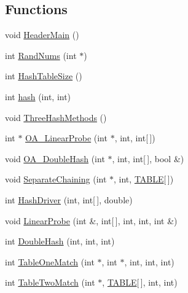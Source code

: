 \subsection*{Functions}
\begin{DoxyCompactItemize}
\item 
void \hyperlink{_bradshaw-_mansfield-_assn2-_h_a_s_h_prog_8cpp_ad0ff1b56e8aa2267183dc975be2704c3}{HeaderMain} ()
\item 
int \hyperlink{_bradshaw-_mansfield-_assn2-_h_a_s_h_prog_8cpp_ad02a3d3bea24e6a374d52753e741ae54}{RandNums} (int $\ast$)
\item 
int \hyperlink{_bradshaw-_mansfield-_assn2-_h_a_s_h_prog_8cpp_a0ab6301502b50757d27084788bab0db3}{HashTableSize} ()
\item 
int \hyperlink{_bradshaw-_mansfield-_assn2-_h_a_s_h_prog_8cpp_a3cbbd19bf1195623cc2c00ce8b55eaeb}{hash} (int, int)
\item 
void \hyperlink{_bradshaw-_mansfield-_assn2-_h_a_s_h_prog_8cpp_ac4885dc21b261220f2a030b1ad06aec5}{ThreeHashMethods} ()
\item 
int $\ast$ \hyperlink{_bradshaw-_mansfield-_assn2-_h_a_s_h_prog_8cpp_aa4c8e3922c8cd75082eae40ba8cd0205}{OA\_\-LinearProbe} (int $\ast$, int, int\mbox{[}$\,$\mbox{]})
\item 
void \hyperlink{_bradshaw-_mansfield-_assn2-_h_a_s_h_prog_8cpp_aa08a3d5e09643b1011e506d60a89a7f2}{OA\_\-DoubleHash} (int $\ast$, int, int\mbox{[}$\,$\mbox{]}, bool \&)
\item 
void \hyperlink{_bradshaw-_mansfield-_assn2-_h_a_s_h_prog_8cpp_ad730cee6dc4ea13d5fabcec47b736c79}{SeparateChaining} (int $\ast$, int, \hyperlink{struct_t_a_b_l_e}{TABLE}\mbox{[}$\,$\mbox{]})
\item 
int \hyperlink{_bradshaw-_mansfield-_assn2-_h_a_s_h_prog_8cpp_acb3d9aabc9ab7fbb9d3ae15ad62c32f1}{HashDriver} (int, int\mbox{[}$\,$\mbox{]}, double)
\item 
void \hyperlink{_bradshaw-_mansfield-_assn2-_h_a_s_h_prog_8cpp_a74bb3e2823ba913f28e3f6711e045824}{LinearProbe} (int \&, int\mbox{[}$\,$\mbox{]}, int, int, int \&)
\item 
int \hyperlink{_bradshaw-_mansfield-_assn2-_h_a_s_h_prog_8cpp_a7b947e56197fe93937e40b0c987f40fb}{DoubleHash} (int, int, int)
\item 
int \hyperlink{_bradshaw-_mansfield-_assn2-_h_a_s_h_prog_8cpp_a1cfe5833c4e03ff0473ca3e3b87f9f1d}{TableOneMatch} (int $\ast$, int $\ast$, int, int, int)
\item 
int \hyperlink{_bradshaw-_mansfield-_assn2-_h_a_s_h_prog_8cpp_ab7be41246bbc3491cbe4151458a15f39}{TableTwoMatch} (int $\ast$, \hyperlink{struct_t_a_b_l_e}{TABLE}\mbox{[}$\,$\mbox{]}, int, int)

\end{DoxyCompactItemize}
